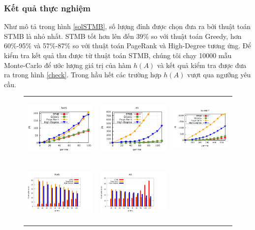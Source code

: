 \subsubsection{Kết quả thực nghiệm} 
Như mô tả trong hình \ref{solSTMB}, số lượng đỉnh được chọn đưa ra bởi thuật toán STMB là nhỏ nhất. STMB tốt hơn lên đến 39\% so với thuật toán Greedy, hơn 60\%-95\% và 57\%-87\% so với thuật toán PageRank và High-Degree tương ứng. Để kiểm tra kết quả thu được từ thuật toán STMB, chúng tôi chạy 10000 mẫu Monte-Carlo để ước lượng giá trị của hàm $h(A)$ và kết quả kiểm tra được đưa ra trong hình \ref{check}. Trong hầu hết các trường hợp $h(A)$ vượt qua ngưỡng yêu cầu.
\begin{figure}[H]
\begin{tabular}{lll}
	\includegraphics[height = 3.2cm]{picture/NetS} &
	\includegraphics[height = 3.2cm]{picture/AS} &   
	\includegraphics[height = 3.2cm]{picture/NetHEPT}
	\\
	\includegraphics[height = 3.2cm]{picture/TimeNetS} &
	\includegraphics[height = 3.2cm]{picture/TimeAS} &   

\end{tabular}
\end{figure}
